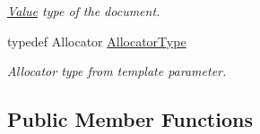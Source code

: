 \begin{DoxyCompactItemize}
\begin{DoxyCompactList}\small\item\em \hyperlink{classValue}{Value} type of the document. \end{DoxyCompactList}\item 
\mbox{\label{classGenericDocument_a35155b912da66ced38d22e2551364c57}} 
typedef Allocator \hyperlink{classGenericDocument_a35155b912da66ced38d22e2551364c57}{Allocator\+Type}
\begin{DoxyCompactList}\small\item\em Allocator type from template parameter. \end{DoxyCompactList}\end{DoxyCompactItemize}
\subsection*{Public Member Functions}
